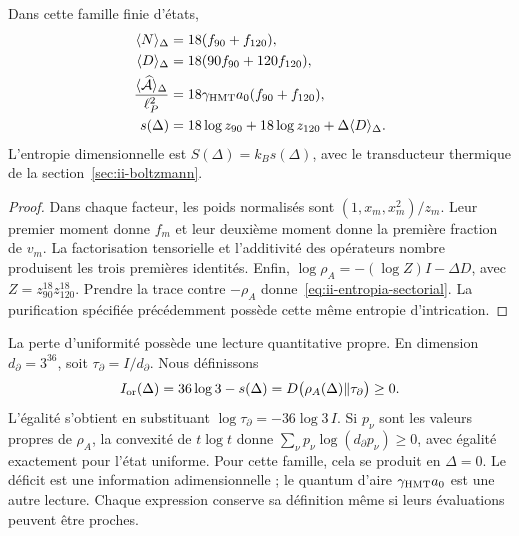 \begin{proposition}
Dans cette famille finie d’états,
\begin{align}
 \langle N\rangle_\Delta&=18(f_{90}+f_{120}),\\
 \langle D\rangle_\Delta&=18(90f_{90}+120f_{120}),\\
 \frac{\langle\widehat{\mathcal A}\rangle_\Delta}{\ell_P^2}
 &=18\gamma_{\mathrm{HMT}}a_0(f_{90}+f_{120}),
 \label{eq:ii-area-media}\\
 s(\Delta)&=18\log z_{90}+18\log z_{120}
                  +\Delta\langle D\rangle_\Delta.
 \label{eq:ii-entropia-sectorial}
\end{align}
L'entropie dimensionnelle est $S(\Delta)=k_Bs(\Delta)$, avec le
transducteur thermique de la section~\ref{sec:ii-boltzmann}.
\end{proposition}
\begin{proof}
Dans chaque facteur, les poids normalisés sont
$(1,x_m,x_m^2)/z_m$. Leur premier moment donne $f_m$ et leur deuxième
moment donne la première fraction de $v_m$. La factorisation tensorielle
et l'additivité des opérateurs nombre produisent les trois premières
identités. Enfin,
$\log\rho_A=-(\log Z)I-\Delta D$, avec
$Z=z_{90}^{18}z_{120}^{18}$. Prendre la trace contre $-\rho_A$
donne~\eqref{eq:ii-entropia-sectorial}. La purification spécifiée
précédemment possède cette même entropie d'intrication.
\end{proof}

La perte d'uniformité possède une lecture quantitative propre.
En dimension \(d_\partial=3^{36}\), soit
\(\tau_\partial=I/d_\partial\). Nous définissons
\begin{equation}
 I_{\rm or}(\Delta)=36\log3-s(\Delta)
 =D\bigl(\rho_A(\Delta)\Vert\tau_\partial\bigr)\ge0.
 \label{eq:ii-area-deficit-informacional}
\end{equation}
L’égalité s’obtient en substituant
\(\log\tau_\partial=-36\log3\,I\). Si \(p_\nu\) sont les
valeurs propres de \(\rho_A\), la convexité de \(t\log t\) donne
\(\sum_\nu p_\nu\log(d_\partial p_\nu)\ge0\), avec égalité
exactement pour l’état uniforme. Pour cette famille, cela se produit en
\(\Delta=0\). Le déficit est une information adimensionnelle ; le quantum
d’aire \(\gamma_{\mathrm{HMT}}a_0\) est une autre lecture. Chaque expression conserve
sa définition même si leurs évaluations peuvent être proches.

